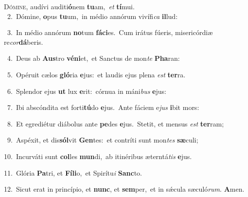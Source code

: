 \lettrine{\initial\textcolor{\initialcolor}{D}}{ómine,} audívi auditi\-\textbf{ó}\-nem \textbf{tu}\-am,~\star \textit{et} \textbf{tí}\-mui.\\
{\numbfont\textcolor{\numbcolor}{~2.}}~Dómine, \textbf{o}\-pus \textbf{tu}\-um,~\star in médio annórum vivífi\textit{ca} \textbf{il}\-lud:\par
{\numbfont\textcolor{\numbcolor}{~3.}}~In médio annórum \textbf{no}\-tum \textbf{fá}\-\textbf{ci}es.~\star Cum irátus fúeris, misericórdiæ re\-\textit{cor}\-\textbf{dá}beris.\par
{\numbfont\textcolor{\numbcolor}{~4.}}~Deus ab \textbf{Aus}\-tro \textbf{vé}\-\textbf{ni}et,~\star et Sanctus de mon\textit{te} \textbf{Pha}\-ran:\par
{\numbfont\textcolor{\numbcolor}{~5.}}~Opéruit cælos \textbf{gló}\-ria \textbf{e}\-jus:~\star et laudis ejus plena \textit{est} \textbf{ter}\-ra.\par
{\numbfont\textcolor{\numbcolor}{~6.}}~Splendor ejus \textbf{ut} lux \textbf{e}\-rit:~\star córnua in máni\textit{bus} \textbf{e}\-jus:\par
{\numbfont\textcolor{\numbcolor}{~7.}}~Ibi abscóndita est forti\-\textbf{tú}\-do \textbf{e}\-jus.~\star Ante fáciem e\textit{jus} \textbf{i}\-bit mors:\par
{\numbfont\textcolor{\numbcolor}{~8.}}~Et egrediétur diábolus ante \textbf{pe}\-des \textbf{e}\-jus.~\star Stetit, et mensus \textit{est} \textbf{ter}\-ram;\par
{\numbfont\textcolor{\numbcolor}{~9.}}~Aspéxit, et dis\-\textbf{sól}\-vit \textbf{Gen}\-tes:~\star et contríti sunt mon\textit{tes} \textbf{sæ}\-culi;\par
{\numbfont\textcolor{\numbcolor}{10.}}~Incurváti sunt \textbf{col}\-les \textbf{mun}\-di,~\star ab itinéribus æterntá\textit{tis} \textbf{e}\-jus.\par
{\numbfont\textcolor{\numbcolor}{11.}}~Glória \textbf{Pa}\-tri, et \textbf{Fí}\-\textbf{li}o,~\star et Spirítu\textit{i} \textbf{Sanc}\-to.\par
{\numbfont\textcolor{\numbcolor}{12.}}~Sicut erat in princípio, et \textbf{nunc}\-, et \textbf{sem}\-per,~\star et in sǽcula sæculó\-\textit{rum}\-. \textbf{A}\-men.\par

